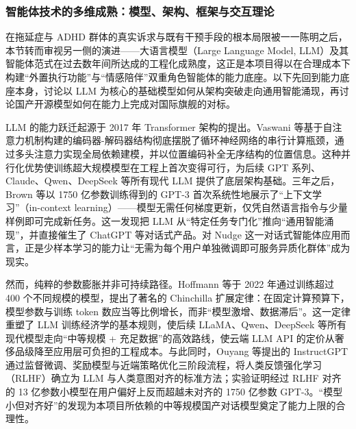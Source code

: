 \subsubsection{智能体技术的多维成熟：模型、架构、框架与交互理论}

%

\par 在拖延症与 ADHD 群体的真实诉求与既有干预手段的根本局限被一一陈明之后，本节转而审视另一侧的演进——大语言模型（Large Language Model, LLM）及其智能体范式在过去数年间所达成的工程化成熟度，这正是本项目得以在合理成本下构建``外置执行功能''与``情感陪伴''双重角色智能体的能力底座。以下先回到能力底座本身，讨论以 LLM 为核心的基础模型如何从架构突破走向通用智能涌现，再讨论国产开源模型如何在能力上完成对国际旗舰的对标。

\par LLM 的能力跃迁起源于 2017 年 Transformer 架构的提出。Vaswani 等基于自注意力机制构建的编码器-解码器结构彻底摆脱了循环神经网络的串行计算瓶颈，通过多头注意力实现全局依赖建模，并以位置编码补全无序结构的位置信息\cite{vaswani2017attention}。这种并行化优势使训练超大规模模型在工程上首次变得可行，为后续 GPT 系列、Claude、Qwen、DeepSeek 等所有现代 LLM 提供了底层架构基础。三年之后，Brown 等以 1750 亿参数训练得到的 GPT-3 首次系统性地展示了``上下文学习''（in-context learning）——模型无需任何梯度更新，仅凭自然语言指令与少量样例即可完成新任务\cite{brown2020gpt3}。这一发现把 LLM 从``特定任务专门化''推向``通用智能涌现''，并直接催生了 ChatGPT 等对话式产品。对 Nudge 这一对话式智能体应用而言，正是少样本学习的能力让``无需为每个用户单独微调即可服务异质化群体''成为现实。

\par 然而，纯粹的参数膨胀并非可持续路径。Hoffmann 等于 2022 年通过训练超过 400 个不同规模的模型，提出了著名的 Chinchilla 扩展定律：在固定计算预算下，模型参数与训练 token 数应当等比例增长，而非``模型激增、数据滞后''\cite{hoffmann2022chinchilla}。这一定律重塑了 LLM 训练经济学的基本规则，使后续 LLaMA、Qwen、DeepSeek 等所有现代模型走向``中等规模 + 充足数据''的高效路线，使云端 LLM API 的定价从奢侈品级降至应用层可负担的工程成本。与此同时，Ouyang 等提出的 InstructGPT 通过监督微调、奖励模型与近端策略优化三阶段流程，将人类反馈强化学习（RLHF）确立为 LLM 与人类意图对齐的标准方法；实验证明经过 RLHF 对齐的 13 亿参数小模型在用户偏好上反而超越未对齐的 1750 亿参数 GPT-3\cite{ouyang2022instructgpt}。``模型小但对齐好''的发现为本项目所依赖的中等规模国产对话模型奠定了能力上限的合理性。

